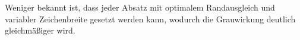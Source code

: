 \documentclass{article}
\begin{document}
\hsize=200pt\parindent=0pt
{
Weniger bekannt ist, dass jeder Absatz mit optimalem Randausgleich und
variabler Zeichenbreite gesetzt werden kann, wodurch die Grauwirkung
deutlich gleichm\"a\ss iger wird.\par}
\end{document}
